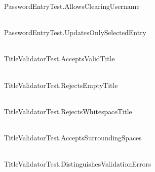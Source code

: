 \begin{DoxyRefList}
\label{test__test000014}%
%
Password\+Entry\+Test.\+Allows\+Clearing\+Username  
\item[{\parbox[t]{\linewidth}{Member \doxylink{_password_entry_test_8cpp_af5511f5b7d190fe36b9c581822fcacf7}{TEST} (Password\+Entry\+Test, Updates\+Only\+Selected\+Entry)}}]\hfill \\
\label{test__test000015}%
%
Password\+Entry\+Test.\+Updates\+Only\+Selected\+Entry  
\item[{\parbox[t]{\linewidth}{Member \doxylink{_title_validator_test_8cpp_a229e70f17700fa014ac49e807092b608}{TEST} (Title\+Validator\+Test, Accepts\+Valid\+Title)}}]\hfill \\
\label{test__test000016}%
%
Title\+Validator\+Test.\+Accepts\+Valid\+Title  
\item[{\parbox[t]{\linewidth}{Member \doxylink{_title_validator_test_8cpp_aeb20bcb9a64f7e714f74d3be012d9327}{TEST} (Title\+Validator\+Test, Rejects\+Empty\+Title)}}]\hfill \\
\label{test__test000017}%
%
Title\+Validator\+Test.\+Rejects\+Empty\+Title  
\item[{\parbox[t]{\linewidth}{Member \doxylink{_title_validator_test_8cpp_a0a48c6afa472f7e85c30725124f0d7dd}{TEST} (Title\+Validator\+Test, Rejects\+Whitespace\+Title)}}]\hfill \\
\label{test__test000018}%
%
Title\+Validator\+Test.\+Rejects\+Whitespace\+Title  
\item[{\parbox[t]{\linewidth}{Member \doxylink{_title_validator_test_8cpp_abc0285624e55437fff3041d925def7c2}{TEST} (Title\+Validator\+Test, Accepts\+Surrounding\+Spaces)}}]\hfill \\
\label{test__test000019}%
%
Title\+Validator\+Test.\+Accepts\+Surrounding\+Spaces  
\item[{\parbox[t]{\linewidth}{Member \doxylink{_title_validator_test_8cpp_a946fbfd55f71ee813b3df085049a4366}{TEST} (Title\+Validator\+Test, Distinguishes\+Validation\+Errors)}}]\hfill \\
\label{test__test000020}%
%
Title\+Validator\+Test.\+Distinguishes\+Validation\+Errors  
\item[{\parbox[t]{\linewidth}{Member \doxylink{_username_validator_test_8cpp_a1c737cab41088d6d9fa859412122b066}{TEST} (Username\+Validator\+Test, Accepts\+Empty\+Username)}}]\hfill \\

\end{DoxyRefList}
